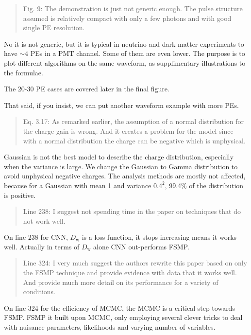 \documentclass[12pt]{article}
\begin{document}
\begin{quote}
Fig. 9: The demonstration is just not generic enough. The pulse structure assumed is relatively compact with only a few photons and with good single PE resolution.
\end{quote}

No it is not generic, but it is typical in neutrino and dark matter experiments to have $\sim 4$ PEs in a PMT channel.  Some of them are even lower. The purpose is to plot different algorithms on the same waveform, as supplimentary illustrations to the formulae.

The 20-30 PE cases are covered later in the final figure.

That said, if you insist, we can put another waveform example with more PEs.

\begin{quote}
Eq. 3.17: As remarked earlier, the assumption of a normal distribution for the charge gain is wrong. And it creates a problem for the model since with a normal distribution the charge can be negative which is unphysical.
\end{quote}

Gaussian is not the best model to describe the charge distribution, especially when the variance is large. We change the Gaussian to Gamma distribution to avoid unphysical negative charges. The analysis methods are mostly not affected, because for a Gaussian with mean 1 and variance $0.4^2$, 99.4\% of the distribution is positive.

\begin{quote}
Line 238: I suggest not spending time in the paper on techniques that do not work well.
\end{quote}

On line 238 for CNN, $D_\mathrm{w}$ is a loss function, it stops increasing means it works well.  Actually in terms of $D_\mathrm{w}$ alone CNN out-performs FSMP.

\begin{quote}
Line 324: I very much suggest the authors rewrite this paper based on only the FSMP technique and provide evidence with data that it works well. And provide much more detail on its performance for a variety of conditions.
\end{quote}

On line 324 for the efficiency of MCMC, the MCMC is a critical step towards FSMP.  FSMP it built upon MCMC, only employing several clever tricks to deal with nuisance parameters, likelihoods and varying number
of variables.
\end{document}
